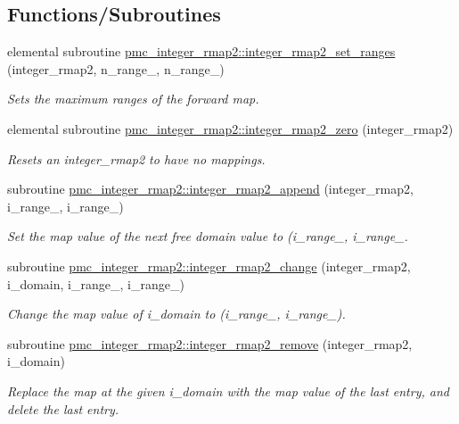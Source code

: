 \subsection*{Functions/\+Subroutines}
\begin{DoxyCompactItemize}
\item 
elemental subroutine \mbox{\hyperlink{namespacepmc__integer__rmap2_aa6b57f76f7da55c1c3e6537737bfa221}{pmc\+\_\+integer\+\_\+rmap2\+::integer\+\_\+rmap2\+\_\+set\+\_\+ranges}} (integer\+\_\+rmap2, n\+\_\+range\+\_, n\+\_\+range\+\_)
\begin{DoxyCompactList}\small\item\em Sets the maximum ranges of the forward map. \end{DoxyCompactList}\item 
elemental subroutine \mbox{\hyperlink{namespacepmc__integer__rmap2_a958ce14f01354b01adabc55480c620ab}{pmc\+\_\+integer\+\_\+rmap2\+::integer\+\_\+rmap2\+\_\+zero}} (integer\+\_\+rmap2)
\begin{DoxyCompactList}\small\item\em Resets an integer\+\_\+rmap2 to have no mappings. \end{DoxyCompactList}\item 
subroutine \mbox{\hyperlink{namespacepmc__integer__rmap2_ae9b0fce5017e7fe869e8e408c730f4d3}{pmc\+\_\+integer\+\_\+rmap2\+::integer\+\_\+rmap2\+\_\+append}} (integer\+\_\+rmap2, i\+\_\+range\+\_, i\+\_\+range\+\_)
\begin{DoxyCompactList}\small\item\em Set the map value of the next free domain value to {\ttfamily (i\+\_\+range\+\_, i\+\_\+range\+\_}. \end{DoxyCompactList}\item 
subroutine \mbox{\hyperlink{namespacepmc__integer__rmap2_aae3247ef6730522e692d01c18fc5587d}{pmc\+\_\+integer\+\_\+rmap2\+::integer\+\_\+rmap2\+\_\+change}} (integer\+\_\+rmap2, i\+\_\+domain, i\+\_\+range\+\_, i\+\_\+range\+\_)
\begin{DoxyCompactList}\small\item\em Change the map value of {\ttfamily i\+\_\+domain} to {\ttfamily (i\+\_\+range\+\_, i\+\_\+range\+\_)}. \end{DoxyCompactList}\item 
subroutine \mbox{\hyperlink{namespacepmc__integer__rmap2_a3f44399fe3fa2f0aec68f32746fa4ccc}{pmc\+\_\+integer\+\_\+rmap2\+::integer\+\_\+rmap2\+\_\+remove}} (integer\+\_\+rmap2, i\+\_\+domain)
\begin{DoxyCompactList}\small\item\em Replace the map at the given {\ttfamily i\+\_\+domain} with the map value of the last entry, and delete the last entry. \end{DoxyCompactList}\item 

\end{DoxyCompactItemize}
